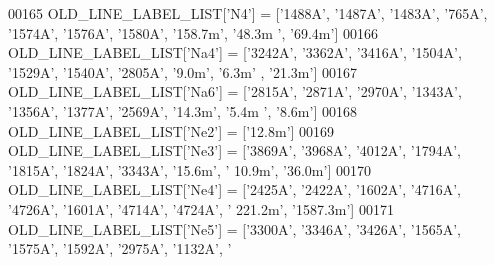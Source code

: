 \begin{DoxyCode}
{{00165 OLD\_LINE\_LABEL\_LIST[\textcolor{stringliteral}{'N4'}] = [\textcolor{stringliteral}{'1488A'}, \textcolor{stringliteral}{'1487A'}, \textcolor{stringliteral}{'1483A'}, \textcolor{stringliteral}{'765A'}, \textcolor{stringliteral}{'1574A'}, \textcolor{stringliteral}{'1576A'}, \textcolor{stringliteral}{'1580A'}, \textcolor{stringliteral}{'158.7m'}, \textcolor{stringliteral}{'48.3m
      '}, \textcolor{stringliteral}{'69.4m'}]
00166 OLD\_LINE\_LABEL\_LIST[\textcolor{stringliteral}{'Na4'}] = [\textcolor{stringliteral}{'3242A'}, \textcolor{stringliteral}{'3362A'}, \textcolor{stringliteral}{'3416A'}, \textcolor{stringliteral}{'1504A'}, \textcolor{stringliteral}{'1529A'}, \textcolor{stringliteral}{'1540A'}, \textcolor{stringliteral}{'2805A'}, \textcolor{stringliteral}{'9.0m'}, \textcolor{stringliteral}{'6.3m'}
      , \textcolor{stringliteral}{'21.3m'}]
00167 OLD\_LINE\_LABEL\_LIST[\textcolor{stringliteral}{'Na6'}] = [\textcolor{stringliteral}{'2815A'}, \textcolor{stringliteral}{'2871A'}, \textcolor{stringliteral}{'2970A'}, \textcolor{stringliteral}{'1343A'}, \textcolor{stringliteral}{'1356A'}, \textcolor{stringliteral}{'1377A'}, \textcolor{stringliteral}{'2569A'}, \textcolor{stringliteral}{'14.3m'}, \textcolor{stringliteral}{'5.4m
      '}, \textcolor{stringliteral}{'8.6m'}]
00168 OLD\_LINE\_LABEL\_LIST[\textcolor{stringliteral}{'Ne2'}] = [\textcolor{stringliteral}{'12.8m'}]
00169 OLD\_LINE\_LABEL\_LIST[\textcolor{stringliteral}{'Ne3'}] = [\textcolor{stringliteral}{'3869A'}, \textcolor{stringliteral}{'3968A'}, \textcolor{stringliteral}{'4012A'}, \textcolor{stringliteral}{'1794A'}, \textcolor{stringliteral}{'1815A'}, \textcolor{stringliteral}{'1824A'}, \textcolor{stringliteral}{'3343A'}, \textcolor{stringliteral}{'15.6m'}, \textcolor{stringliteral}{'
      10.9m'}, \textcolor{stringliteral}{'36.0m'}]
00170 OLD\_LINE\_LABEL\_LIST[\textcolor{stringliteral}{'Ne4'}] = [\textcolor{stringliteral}{'2425A'}, \textcolor{stringliteral}{'2422A'}, \textcolor{stringliteral}{'1602A'}, \textcolor{stringliteral}{'4716A'}, \textcolor{stringliteral}{'4726A'}, \textcolor{stringliteral}{'1601A'}, \textcolor{stringliteral}{'4714A'}, \textcolor{stringliteral}{'4724A'}, \textcolor{stringliteral}{'
      221.2m'}, \textcolor{stringliteral}{'1587.3m'}]
00171 OLD\_LINE\_LABEL\_LIST[\textcolor{stringliteral}{'Ne5'}] = [\textcolor{stringliteral}{'3300A'}, \textcolor{stringliteral}{'3346A'}, \textcolor{stringliteral}{'3426A'}, \textcolor{stringliteral}{'1565A'}, \textcolor{stringliteral}{'1575A'}, \textcolor{stringliteral}{'1592A'}, \textcolor{stringliteral}{'2975A'}, \textcolor{stringliteral}{'1132A'}, \textcolor{stringliteral}{'
}}}
\end{DoxyCode}
